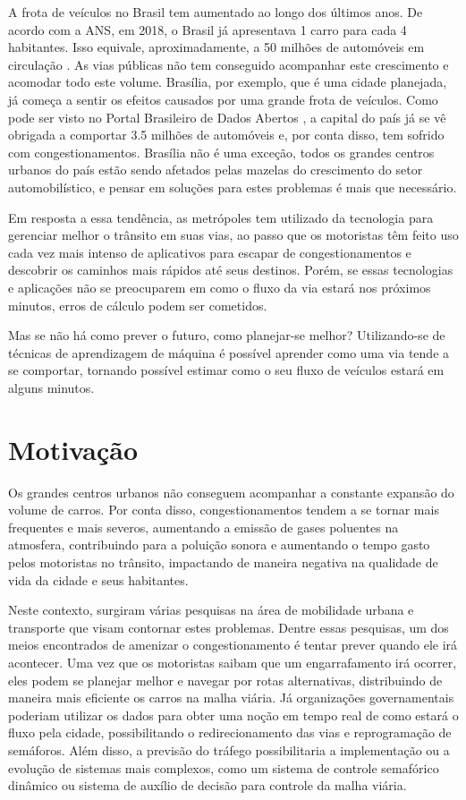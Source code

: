 A frota  de  veículos no Brasil tem aumentado ao longo  dos últimos anos. De acordo com a \acrfull{ANS}, em 2018, o Brasil já apresentava 1 carro para cada 4 habitantes. Isso equivale, aproximadamente, a 50 milhões de automóveis em circulação \cite{G1}. As vias públicas não tem conseguido acompanhar este crescimento e acomodar todo este volume. Brasília, por exemplo, que é uma cidade planejada, já começa a sentir os efeitos causados por uma grande frota de veículos. Como pode ser visto no Portal Brasileiro de Dados Abertos \cite{detran_2018}, a capital do país já se vê obrigada a comportar 3.5 milhões de automóveis e, por conta disso, tem sofrido com congestionamentos. Brasília não é uma exceção, todos os grandes centros urbanos do país estão sendo afetados pelas mazelas do crescimento do setor automobilístico, e pensar em soluções para estes problemas é mais que necessário.

 Em resposta a essa tendência, as metrópoles tem utilizado da tecnologia para gerenciar melhor o trânsito em suas vias, ao passo que os motoristas têm feito uso cada vez mais intenso de aplicativos para escapar de congestionamentos e descobrir os caminhos mais rápidos até seus destinos. Porém, se essas tecnologias e aplicações não se preocuparem em como o fluxo da via estará nos próximos minutos, erros de cálculo podem ser cometidos.

Mas se não há como prever o futuro, como planejar-se melhor? Utilizando-se de técnicas de aprendizagem de máquina é possível aprender como uma via tende a se comportar, tornando possível estimar como o seu fluxo de veículos estará em alguns minutos.

\section{Motivação}

Os grandes centros urbanos não conseguem acompanhar a constante expansão do volume de carros. Por conta disso, congestionamentos tendem a se tornar mais frequentes e mais severos, aumentando a emissão de gases poluentes na atmosfera, contribuindo para a poluição sonora e aumentando o tempo gasto pelos motoristas no trânsito, impactando de maneira negativa na qualidade de vida da cidade e seus habitantes.

Neste contexto, surgiram várias pesquisas na área de mobilidade urbana e transporte que visam contornar estes problemas. Dentre essas pesquisas, um dos meios encontrados de amenizar o congestionamento é tentar prever quando ele irá acontecer. Uma vez que os motoristas saibam que um engarrafamento irá ocorrer, eles podem se planejar melhor e navegar por rotas alternativas, distribuindo de maneira mais eficiente os carros na malha viária. Já organizações governamentais poderiam utilizar os dados para obter uma noção em tempo real de como estará o fluxo pela cidade, possibilitando o redirecionamento das vias e reprogramação de semáforos. Além disso, a previsão do tráfego possibilitaria a implementação ou a evolução de sistemas mais complexos, como um sistema de controle semafórico dinâmico ou sistema de auxílio de decisão para controle da malha viária.

